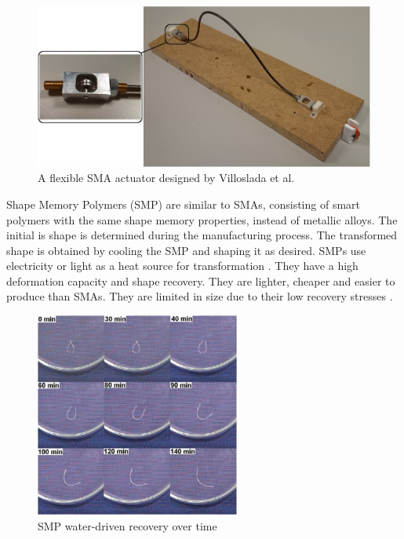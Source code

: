 \begin{figure}[H]
	\centering
	\includegraphics[width=1\textwidth]{SMA.png}
	\caption{A flexible SMA actuator designed by Villoslada et al. \cite{Villoslada2015}}
	\label{fig:sma}
\end{figure}

Shape Memory Polymers (SMP) are similar to SMAs, consisting of smart polymers with the same shape memory properties, instead of metallic alloys. The initial is shape is determined during the manufacturing process. The transformed shape is obtained by cooling the SMP and shaping it as desired. SMPs use electricity or light as a heat source for transformation \cite{Behl2007}. They have a high deformation capacity and shape recovery. They are lighter, cheaper and easier to produce than SMAs. They are limited in size due to their low recovery stresses \cite{Huang2005, Rodriguez2016, Behl2007}.

\begin{figure}[H]
	\centering
	\includegraphics[width=0.6\textwidth]{SMP.png}
	\caption{SMP water-driven recovery over time \cite{Huang2005}}
	\label{fig:smp}
\end{figure}

